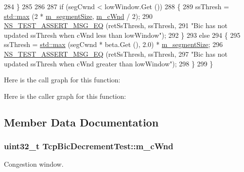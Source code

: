 \begin{DoxyCode}
284     \}
285 
286 
287   \textcolor{keywordflow}{if} (segCwnd < lowWindow.Get ())
288     \{
289       ssThresh = \hyperlink{80211b_8c_affe776513b24d84b39af8ab0930fef7f}{std::max} (2 * \hyperlink{classTcpBicDecrementTest_a6430400f92d1bcb3832692cdb4936475}{m\_segmentSize},  \hyperlink{classTcpBicDecrementTest_a1facb1a7596141c8a5e49af8ebad7261}{m\_cWnd} / 2);
290       \hyperlink{group__testing_ga2a9d78cffb3db8e867c35fff0b698cf5}{NS\_TEST\_ASSERT\_MSG\_EQ} (retSsThresh, ssThresh,
291                              \textcolor{stringliteral}{"Bic has not updated ssThresh when cWnd less than lowWindow"});
292     \}
293   \textcolor{keywordflow}{else}
294     \{
295       ssThresh = \hyperlink{80211b_8c_affe776513b24d84b39af8ab0930fef7f}{std::max} (segCwnd * beta.Get (), 2.0) * \hyperlink{classTcpBicDecrementTest_a6430400f92d1bcb3832692cdb4936475}{m\_segmentSize};
296       \hyperlink{group__testing_ga2a9d78cffb3db8e867c35fff0b698cf5}{NS\_TEST\_ASSERT\_MSG\_EQ} (retSsThresh, ssThresh,
297                              \textcolor{stringliteral}{"Bic has not updated ssThresh when cWnd greater than lowWindow"});
298     \}
299 \}
\end{DoxyCode}


Here is the call graph for this function\+:




Here is the caller graph for this function\+:




\subsection{Member Data Documentation}
\subsubsection[{\texorpdfstring{m\+\_\+c\+Wnd}{m_cWnd}}]{\setlength{\rightskip}{0pt plus 5cm}uint32\+\_\+t Tcp\+Bic\+Decrement\+Test\+::m\+\_\+c\+Wnd\hspace{0.3cm}{\ttfamily [private]}}\hypertarget{classTcpBicDecrementTest_a1facb1a7596141c8a5e49af8ebad7261}{}\label{classTcpBicDecrementTest_a1facb1a7596141c8a5e49af8ebad7261}


Congestion window. 

